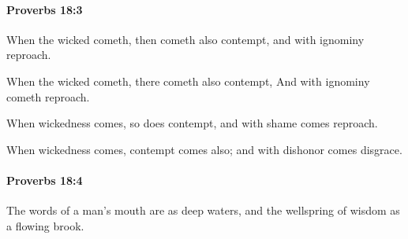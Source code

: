 		\paragraph{Proverbs 18:3} %
			\label{PROVERBS-18-3}

			When the wicked cometh, then cometh also contempt, and with ignominy reproach.

			\begin{versebox}
					\item[BHS] 
					\item[ASV] When the wicked cometh, there cometh also contempt, And with ignominy cometh reproach.
					\item[NIV] When wickedness comes, so does contempt, and with shame comes reproach.
					\item[NRSV] When wickedness comes, contempt comes also; and with dishonor comes disgrace.
			\end{versebox}

		\paragraph{Proverbs 18:4} %
			\label{PROVERBS-18-4}

			The words of a man’s mouth are as deep waters, and the wellspring of wisdom as a flowing brook.

